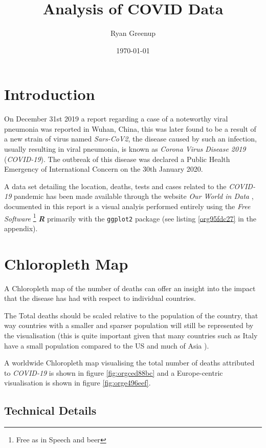 \documentclass[11pt]{article}
\author{Ryan Greenup}
\date{\today}
\title{Analysis of COVID Data}
\begin{document}
\maketitle
\tableofcontents


\section{Introduction}
\label{sec:org7e08050}
On December 31st 2019 a report regarding a case of a noteworthy viral pneumonia
was reported in Wuhan, China, this was later found to be a result of a new
strain of virus named \emph{Sars-CoV2}, the disease caused by such an infection,
usually resulting in viral pneumonia, is known as \emph{Corona Virus Disease 2019}
(\emph{COVID-19}). The outbreak of this disease was declared a Public Health
Emergency of International Concern on the 30th January 2020.
\cite{worldhealthorganization2020}

A data set detailing the location, deaths, tests and cases related to the
\emph{COVID-19} pandemic has been made available through the website \emph{Our World in
Data} \cite{ritchie2020}, documented in this report is a visual analyis
performed entirely using the \emph{Free Software} \footnote{Free as in Speech and beer} \textbf{\emph{R}} \cite{rcoreteam2020}
primarily with the \texttt{ggplot2} package \cite{wickham2016} (see listing \ref{org95fdc27} in the
appendix).

\section{Chloropleth Map}
\label{sec:org6bd4e92}
A Chloropleth map of the number of deaths can offer an insight into the impact
that the disease has had with respect to individual countries.

The Total deaths should be scaled relative to the population of the country,
that way countries with a smaller and sparser population will still be
represented by the visualisation (this is quite important given that many
countries such as Italy have a small population compared to the US and much of
Asia \cite{2020n}).

A worldwide Chloropleth map visualising the total number of deaths attributed to
\emph{COVID-19} is shown in figure \ref{fig:orgced88bc} and a Europe-centric visualisation is shown
in figure \ref{fig:orge496eef}.

\subsection{Technical Details}
\label{sec:org703ff5c}
\end{document}
